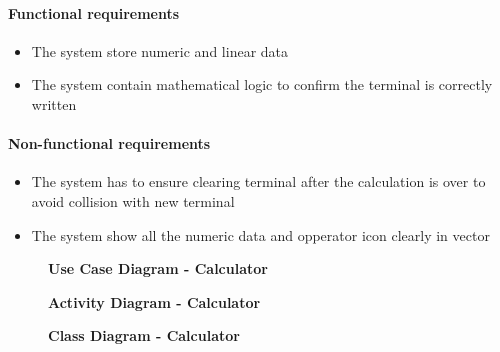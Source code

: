 \documentclass{article}
\begin{document}
		\paragraph{Functional requirements}
		\begin{itemize}
			\item The system store numeric and linear data
			\item The system contain mathematical logic to confirm the terminal is correctly written
		\end{itemize}
		
		\paragraph{Non-functional requirements}
		\begin{itemize}
			\item The system has to ensure clearing terminal after the calculation is over to avoid collision with new terminal
			\item The system show all the numeric data and opperator icon clearly in vector
		\end{itemize}
		\newpage
		
		\begin{figure}[htbp]
			\textbf{Use Case Diagram - Calculator}
			\centering
			\begin{subfigure}{\textwidth}
				\resizebox{\textwidth}{!}{}
			\end{subfigure}
			\begin{subfigure}{\textwidth}
				
			\end{subfigure}
		\end{figure}
		\clearpage
		
		\begin{figure}[htbp]
			\textbf{Activity Diagram - Calculator}
			\centering
			\begin{subfigure}{\textwidth}
				\centering
				\scalebox{1.0}{}
			\end{subfigure}
			\begin{subfigure}{\textwidth}
				
			\end{subfigure}
		\end{figure}
		\clearpage
		
		\begin{figure}[htbp]
			\textbf{Class Diagram - Calculator}
			\centering
			\begin{subfigure}{\textwidth}
				\resizebox{\textwidth}{!}{}
			\end{subfigure}
			\begin{subfigure}{\textwidth}
				
			\end{subfigure}
		\end{figure}
		\clearpage
		
\end{document}
